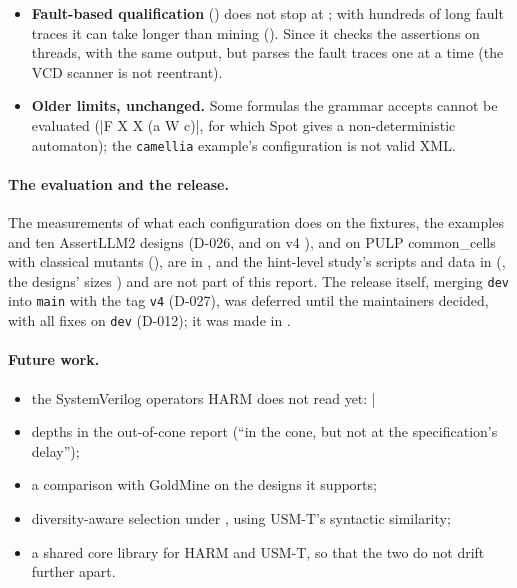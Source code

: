 \begin{itemize}
\item \textbf{Fault-based qualification} () does not stop at ; with hundreds of long fault traces it can take longer than mining (). Since  it checks the assertions on  threads, with the same output, but parses the fault traces one at a time (the VCD scanner is not reentrant).
\item \textbf{Older limits, unchanged.} Some formulas the grammar accepts cannot be evaluated (\code|F X X (a W c)|, for which Spot gives a non-deterministic automaton); the \texttt{camellia} example's configuration is not valid XML.
\end{itemize}

\paragraph{The evaluation and the release.} The measurements of what each configuration does on the fixtures, the examples and ten AssertLLM2 designs (D-026, and on v4 ), and on PULP common\_cells with classical mutants (), are in , and the hint-level study's scripts and data in  (, the designs' sizes ) and are not part of this report. The release itself, merging \texttt{dev} into \texttt{main} with the tag \texttt{v4} (D-027), was deferred until the maintainers decided, with all fixes on \texttt{dev} (D-012); it was made in .

\paragraph{Future work.}
\begin{itemize}
\item the SystemVerilog operators HARM does not read yet: \code|%
\item depths in the out-of-cone report (``in the cone, but not at the specification's delay'');
\item a comparison with GoldMine on the designs it supports;
\item diversity-aware selection under , using USM-T's syntactic similarity;
\item a shared core library for HARM and USM-T, so that the two do not drift further apart.
\end{itemize}
